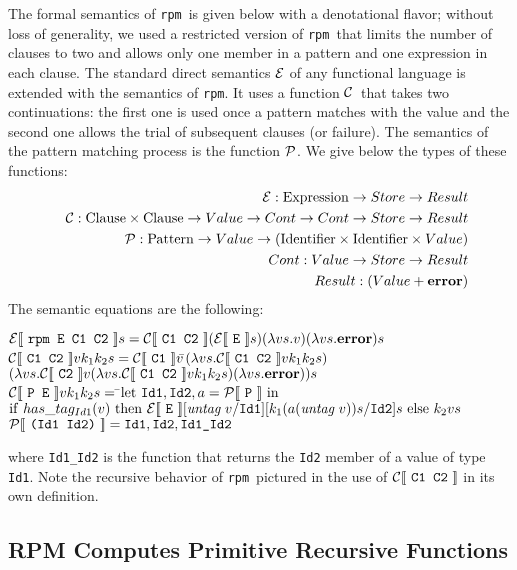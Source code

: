 \documentclass[a4paper,11pt]{article}
\newcommand{\rpm}{\texttt{rpm}}
\newcommand{\E}{\mbox{${\cal E}$}}
\newcommand{\C}{\mbox{${\cal C}$}}
\renewcommand{\P}{\mbox{${\cal P}$}}
\newcommand{\dbl}[1]{\mbox{$\lbrack\!\lbrack$~\texttt{#1}~$\rbrack\!\rbrack$}}
\newcommand{\Exp}{{\rm Expression}}
\newcommand{\Ide}{{\rm Identifier}}
\newcommand{\Cl}{{\rm Clause}}
\newcommand{\Pat}{{\rm Pattern}}
\begin{document}
The formal semantics of \rpm\ is given below with a denotational
flavor; without loss of generality, we used a restricted version of
\rpm\ that limits the number of clauses to two and allows only one
member in a pattern and one expression in each clause.
The standard direct semantics $\E$ of any functional
language is extended with the semantics of \rpm. It uses a
function \C\ that takes two continuations: the first one is used once
a pattern matches with the value and the second one allows the trial
of subsequent clauses (or failure). The semantics of the pattern
matching process is the function $\P$. We give below the types of
these functions:
\begin{eqnarray*}
&&\E : \Exp \rightarrow Store \rightarrow Result \\
&&\C : \Cl \times \Cl \rightarrow Value \rightarrow Cont \rightarrow Cont
        \rightarrow Store \rightarrow Result \\
&&\P : \Pat \rightarrow Value \rightarrow 
        (\Ide \times \Ide \times Value) \\
&&Cont : Value \rightarrow Store \rightarrow Result \\
&& Result :  (Value + {\bf error})
\end{eqnarray*}
The semantic equations are the following:
\begin{tabbing}
$\E\dbl{rpm E C1 C2}s = 
        \C\dbl{C1 C2}(\E\dbl{E}s)(\lambda vs.v)(\lambda vs.{\bf error})s $\\
$\C\dbl{C1 C2}vk_1k_2s = 
        \C\dbl{C1}v$\=$(\lambda vs.\C\dbl{C1 C2}vk_1k_2s)$ \\
        \>$(\lambda vs.\C\dbl{C2}v(\lambda vs.\C\dbl{C1 C2}vk_1k_2s)
        (\lambda vs.{\bf error}))s$ \\
$\C\dbl{P E}vk_1k_2s =$ \=${\rm let}~\texttt{Id1},\texttt{Id2},a = 
        \P\dbl{P}~{\rm in}$\\
        \>${\rm if}~has\_tag_{Id1}(v)~{\rm then}~
                \E\dbl{E}[\emph{untag}~v/\texttt{Id1}][k_1 (a(\emph{untag}~v)) s/\texttt{Id2}]s~
        {\rm else}~k_2 v s$ \\
$\P\dbl{(Id1 Id2)} = \texttt{Id1}, \texttt{Id2}, \texttt{Id1\_Id2}$
\end{tabbing}
where \texttt{Id1\_Id2} is the function that returns the \texttt{Id2}
member of a value of type \texttt{Id1}.  Note the recursive behavior of
\rpm\ pictured in the use of $\C\dbl{C1 C2}$ in its own definition.

\subsection{RPM Computes Primitive Recursive Functions}
\end{document}
